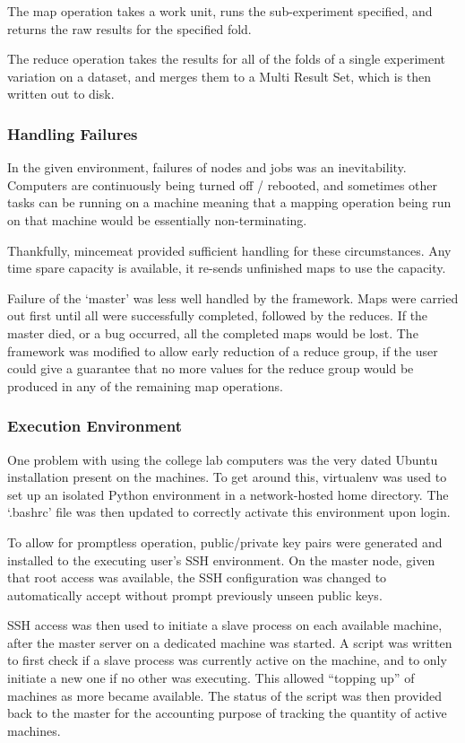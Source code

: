 \documentclass[a4paper,11pt]{report}
\begin{document}
The map operation takes a work unit, runs the sub-experiment specified, and returns the raw results for the specified fold.

The reduce operation takes the results for all of the folds of a single experiment variation on a dataset, and merges them to a Multi Result Set, which is then written out to disk.

\subsubsection{Handling Failures}

In the given environment, failures of nodes and jobs was an inevitability. Computers are continuously being turned off / rebooted, and sometimes other tasks can be running on a machine meaning that a mapping operation being run on that machine would be essentially non-terminating.

Thankfully, mincemeat provided sufficient handling for these circumstances. Any time spare capacity is available, it re-sends unfinished maps to use the capacity.

Failure of the `master' was less well handled by the framework. Maps were carried out first until all were successfully completed, followed by the reduces. If the master died, or a bug occurred, all the completed maps would be lost. The framework was modified to allow early reduction of a reduce group, if the user could give a guarantee that no more values for the reduce group would be produced in any of the remaining map operations.

\subsubsection{Execution Environment}
One problem with using the college lab computers was the very dated Ubuntu installation present on the machines. To get around this, virtualenv \citep{prog:virtualenv} was used to set up an isolated Python environment in a network-hosted home directory. The `.bashrc' file was then updated to correctly activate this environment upon login.

To allow for promptless operation, public/private key pairs were generated and installed to the executing user's SSH environment. On the master node, given that root access was available, the SSH configuration was changed to automatically accept without prompt previously unseen public keys.

SSH access was then used to initiate a slave process on each available machine, after the master server on a dedicated machine was started. A script was written to first check if a slave process was currently active on the machine, and to only initiate a new one if no other was executing. This allowed ``topping up'' of machines as more became available. The status of the script was then provided back to the master for the accounting purpose of tracking the quantity of active machines.
\end{document}
